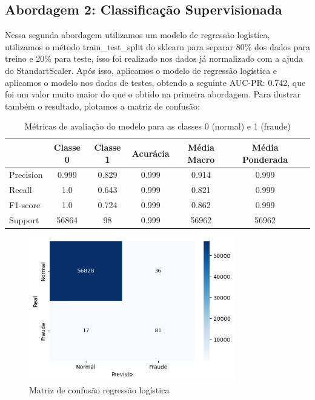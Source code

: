 \documentclass[conference]{IEEEtran}
\begin{document}
\subsection{Abordagem 2: Classificação Supervisionada}
\label{subsec:abordagem2}
  Nessa segunda abordagem utilizamos um modelo de regressão logística, utilizamos o método train\_test\_split do sklearn para separar 80\% dos dados para treino e 20\% para teste, isso foi realizado nos dados já normalizado com a ajuda do StandartScaler. Após isso, aplicamos o modelo de regressão logística e aplicamos o modelo nos dados de testes, obtendo a seguinte AUC-PR: 0.742, que foi um valor muito maior do que o obtido na primeira abordagem. Para ilustrar também o resultado, plotamos a matriz de confusão:
  \begin{table}[H]
      \centering
      \begin{tabular}{lcccccc}
          \toprule
          & \textbf{Classe 0} & \textbf{Classe 1} & \textbf{Acurácia} & \textbf{Média Macro} & \textbf{Média Ponderada} \\
          \midrule
          Precision   & 0.999 & 0.829 & 0.999 & 0.914 & 0.999 \\
          Recall     & 1.0 & 0.643 & 0.999 & 0.821 & 0.999 \\
          F1-score               & 1.0 & 0.724 & 0.999 & 0.862 & 0.999 \\
          Support      & 56864    & 98       & 0.999 & 56962    & 56962    \\
          \bottomrule
      \end{tabular}
      \caption{Métricas de avaliação do modelo para as classes 0 (normal) e 1 (fraude)}
      \label{tab:metricas_classificacao}
  \end{table}
  \begin{figure}[H]
    \centering
    \includegraphics[width=0.8\textwidth]{../output/matriz de confusao sem threshold regressao logistica.png}
    \caption{Matriz de confusão regressão logística}
    \label{fig:matriz_confusao_regressao_logistica}
  \end{figure}
\end{document}
